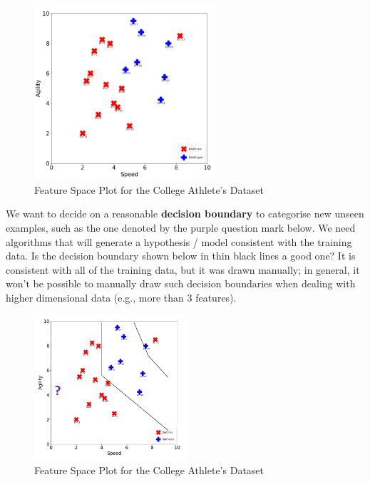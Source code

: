 \documentclass[a4paper,11pt]{article}
\begin{document}
\begin{figure}[H]
    \centering
    \includegraphics[width=0.6\textwidth]{./images/feature_space_lot_college_athlete.png}
    \caption{Feature Space Plot for the College Athlete's Dataset}
\end{figure}

We want to decide on a reasonable \textbf{decision boundary} to categorise new unseen examples, such as the one
denoted by the purple question mark below.
We need algorithms that will generate a hypothesis / model consistent with the training data.
Is the decision boundary shown below in thin black lines a good one? 
It is consistent with all of the training data, but it was drawn manually; in general, it won't be possible to 
manually draw such decision boundaries when dealing with higher dimensional data (e.g., more than 3 features).

\begin{figure}[H]
    \centering
    \includegraphics[width=0.5\textwidth]{./images/feature_space_lot_college_athlete_decision_boundary.png}
    \caption{Feature Space Plot for the College Athlete's Dataset}
\end{figure}
\end{document}
